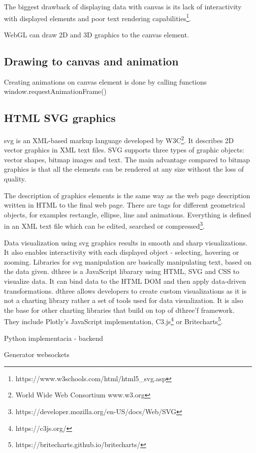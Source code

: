 The biggest drawback of displaying data with canvas is its lack of interactivity with displayed elements and poor text rendering capabilities\footnote{https://www.w3schools.com/html/html5\_svg.asp}.

WebGL can draw 2D and 3D graphics to the canvas element.


\subsection{Drawing to canvas and animation}





Creating animations on canvas element is done by calling functions 
window.requestAnimationFrame()


\subsection{HTML SVG graphics}

\ac{svg} is an XML-based markup language developed by W3C\footnote{World Wide Web Consortium www.w3.org}. It describes 2D vector graphics in XML text files. SVG supports three types of graphic objects: vector shapes, bitmap images and text. The main advantage compared to bitmap graphics is that all the elements can be rendered at any size without the loss of quality. 

The description of graphics elements is the same way as the web page description written in HTML to the final web page. There are tags for different geometrical objects, for examples rectangle, ellipse, line and animations. Everything is defined in an XML text file which can be edited, searched or compressed\footnote{https://developer.mozilla.org/en-US/docs/Web/SVG}.

Data visualization using \ac{svg} graphics results in smooth and sharp visualizations. It also enables interactivity with each displayed object - selecting, hovering or zooming. Libraries for \ac{svg} manipulation are basically manipulating text, based on the data given. \ac{dthree} is a JavaScript libarary using HTML, SVG and CSS to visualize data. It can bind data to the HTML DOM and then apply data-driven transformations. \ac{dthree} allows developers to create custom visualizations as it is not a charting library rather a set of tools used for data visualization. It is also the base for other charting libraries that build on top of \ac{dthree}'f framework. They include Plotly's JavaScript implementation, C3.js\footnote{https://c3js.org/} or Britecharts\footnote{https://britecharts.github.io/britecharts/}.




Python implementacia - backend

Generator
websockets
